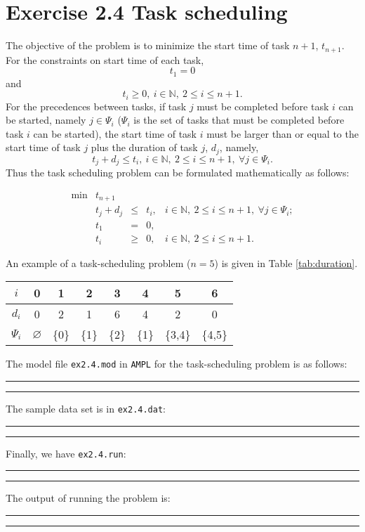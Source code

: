 \section{Exercise 2.4 Task scheduling}

The objective of the problem is to minimize the start time of task $n+1$, $t_{n+1}$. For the constraints on start time of each task, $$t_1 = 0$$ and $$t_i \geq 0, ~i \in \mathbb{N}, ~2 \leq i \leq n+1.$$ For the precedences between tasks, if task $j$ must be completed before task $i$ can be started, namely $j \in \Psi_i$ ($\Psi_i$ is the set of tasks that must be completed before task $i$ can be started), the start time of task $i$ must be larger than or equal to the start time of task $j$ plus the duration of task $j$, $d_j$, namely, $$t_j + d_j \leq t_i,~i \in \mathbb{N}, ~2 \leq i \leq n+1,~\forall j \in \Psi_i.$$ Thus the task scheduling problem can be formulated mathematically as follows:

\[
\begin{array}{rrcll}
 \min & t_{n+1}  &  &   & \\
      &  t_j + d_j  &   \leq  & t_i, &i \in \mathbb{N}, ~2 \leq i \leq n+1,~\forall j \in \Psi_i; \\
      &  t_1 & = & 0, & \\
      &  t_i & \geq & 0, & i \in \mathbb{N}, ~2 \leq i \leq n+1.
\end{array}
\]

An example of a task-scheduling problem ($n=5$) is given in Table \ref{tab:duration}.

\begin{table*}[!h]
\centering
\small
\begin{tabular}{|c|c|c|c|c|c|c|c|}\hline

$i$ & 0 & 1 & 2 & 3 & 4 & 5 & 6  \\\hline
$d_i$ & 0 & 2 & 1 & 6 & 4 & 2 & 0 \\\hline
$\Psi_i$ & $\varnothing$ & \{0\} & \{1\} & \{2\} & \{1\} & \{3,4\} & \{4,5\} \\\hline
\end{tabular}
\caption{Duration of each task, and precedences between tasks}
\label{tab:duration}
\end{table*}

The model file {\tt ex2.4.mod} in {\tt AMPL} for the task-scheduling problem is as follows:

\bigskip
\hrule
\small

\normalsize
\hrule
\bigskip

The sample data set is in {\tt ex2.4.dat}:

\bigskip
\hrule
\small

\normalsize
\hrule
\bigskip

Finally, we have {\tt ex2.4.run}:

\bigskip
\hrule
\small

\normalsize
\hrule
\bigskip

The output of running the problem is:

\bigskip
\hrule
\small

\normalsize
\hrule
\bigskip

